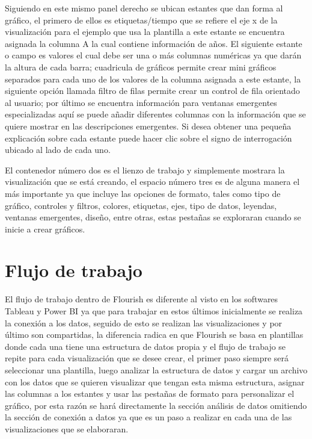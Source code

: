 \documentclass[
]{book}
\begin{document}
Siguiendo en este mismo panel derecho se ubican estantes que dan forma al gráfico, el primero de ellos es etiquetas/tiempo que se refiere el eje x de la visualización para el ejemplo que usa la plantilla a este estante se encuentra asignada la columna A la cual contiene información de años. El siguiente estante o campo es valores el cual debe ser una o más columnas numéricas ya que darán la altura de cada barra; cuadricula de gráficos permite crear mini gráficos separados para cada uno de los valores de la columna asignada a este estante, la siguiente opción llamada filtro de filas permite crear un control de fila orientado al usuario; por último se encuentra información para ventanas emergentes especializadas aquí se puede añadir diferentes columnas con la información que se quiere mostrar en las descripciones emergentes. Si desea obtener una pequeña explicación sobre cada estante puede hacer clic sobre el signo de interrogación ubicado al lado de cada uno.

El contenedor número dos es el lienzo de trabajo y simplemente mostrara la visualización que se está creando, el espacio número tres es de alguna manera el más importante ya que incluye las opciones de formato, tales como tipo de gráfico, controles y filtros, colores, etiquetas, ejes, tipo de datos, leyendas, ventanas emergentes, diseño, entre otras, estas pestañas se exploraran cuando se inicie a crear gráficos.

\hypertarget{flujo-de-trabajo-1}{%
\section{Flujo de trabajo}\label{flujo-de-trabajo-1}}

El flujo de trabajo dentro de Flourish es diferente al visto en los softwares Tableau y Power BI ya que para trabajar en estos últimos inicialmente se realiza la conexión a los datos, seguido de esto se realizan las visualizaciones y por último son compartidas, la diferencia radica en que Flourish se basa en plantillas donde cada una tiene una estructura de datos propia y el flujo de trabajo se repite para cada visualización que se desee crear, el primer paso siempre será seleccionar una plantilla, luego analizar la estructura de datos y cargar un archivo con los datos que se quieren visualizar que tengan esta misma estructura, asignar las columnas a los estantes y usar las pestañas de formato para personalizar el gráfico, por esta razón se hará directamente la sección análisis de datos omitiendo la sección de conexión a datos ya que es un paso a realizar en cada una de las visualizaciones que se elaboraran.
\end{document}

